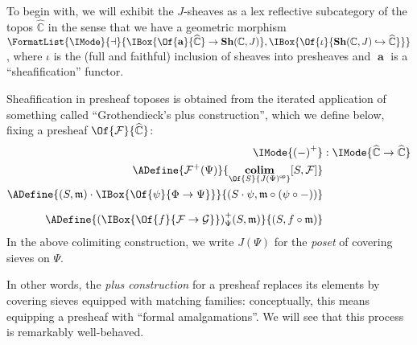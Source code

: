 \documentclass{article}
\DeclareMathOperator\Colim{\mathbf{colim}}
\newcommand\OpCat[1]{{{#1}^{\mathsf{op}}}}
\newcommand\Psh[1]{\widehat{#1}}
\newcommand\Sh[1]{\mathbf{Sh} (#1)}
\DeclareMathOperator{\Sheafify}{\mathbf{a}}
\newcommand\AreAdjoint[1]{\FormatList{\IMode}{\dashv}{#1}}
\newcommand\AOf[2]{\IMode{#1}&:\IMode{#2}}
\newcommand\Plus[1]{{#1}^+}
\begin{document}
To begin with, we will exhibit the $J$-sheaves as a lex reflective
subcategory of the topos $\Psh{\mathbb{C}}$ in the sense that we have
a geometric morphism
$\AreAdjoint{\IBox{\Of{\Sheafify}{\Psh{\mathbb{C}}}\to
    \Sh{\mathbb{C},J}},\IBox{\Of{\iota}{\Sh{\mathbb{C},J}\hookrightarrow\Psh{\mathbb{C}}}}}$,
where $\iota$ is the (full and faithful) inclusion of sheaves into
presheaves and $\Sheafify$ is a ``sheafification'' functor.

Sheafification in presheaf toposes is obtained from the iterated
application of something called ``Grothendieck's plus construction'',
which we define below, fixing a presheaf $\Of{\mathcal{F}}{\Psh{\mathbb{C}}}$:
\begin{align*}
  \AOf{
    \Plus{(-)}
  }{
    \Psh{\mathbb{C}}\to\Psh{\mathbb{C}}
  }
  \\
  \ADefine{
    \Plus{\mathcal{F}}(\Psi)
  }{
    \Colim_{\Of{S}{\OpCat{J(\Psi)}}}
    [S,\mathcal{F}]
  }
  \\
  \ADefine{
    (S,\mathfrak{m})\cdot\IBox{\Of{\psi}{\Phi\to\Psi}}
  }{
    (S\cdot\psi, \mathfrak{m}\circ (\psi\circ-))
  }
  \\[6pt]
  \ADefine{
    \Plus{(\IBox{\Of{f}{\mathcal{F}\to\mathcal{G}}})}_\Psi(S,\mathfrak{m})
  }{
    (S,f\circ\mathfrak{m})
  }
\end{align*}
In the above colimiting construction, we write $J(\Psi)$ for the
\emph{poset} of covering sieves on $\Psi$.

In other words, the \emph{plus construction} for a presheaf replaces
its elements by covering sieves equipped with matching families:
conceptually, this means equipping a presheaf with ``formal
amalgamations''. We will see that this process is remarkably
well-behaved.
\end{document}

